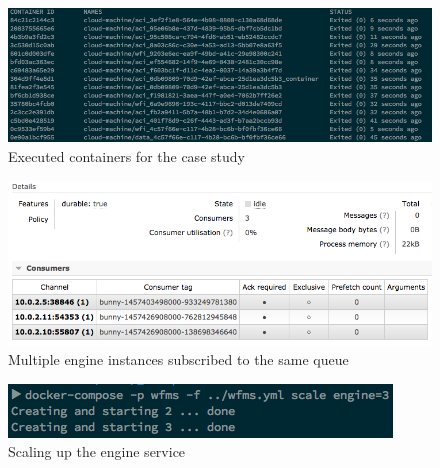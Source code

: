   \begin{figure}[htbp]
    \centering
    \includegraphics[width=\textwidth]{./content/images/usecase/case_study_25.png}
    \caption{Executed containers for the case study}
    \label{fig:exe_containers}
  \end{figure}

  \begin{figure}[htbp]
    \centering
    \includegraphics[width=\textwidth]{./content/images/usecase/case_study_27.png}
    \caption{Multiple engine instances subscribed to the same queue}
    \label{fig:mult_engines}
  \end{figure}

  \begin{figure}[htbp]
    \centering
    \includegraphics[width=\textwidth]{./content/images/usecase/case_study_28.png}
    \caption{Scaling up the engine service}
    \label{fig:mult_engines_2}
  \end{figure}




